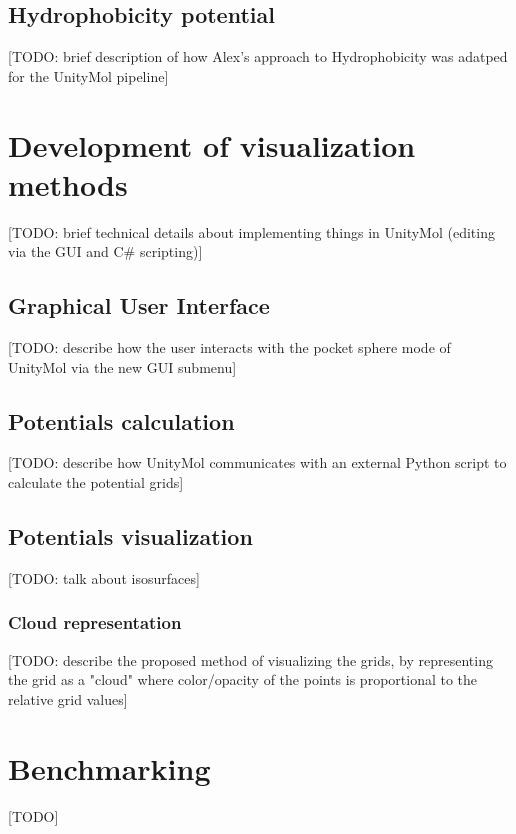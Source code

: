   \subsection{Hydrophobicity potential}
    [TODO: brief description of how Alex's approach to Hydrophobicity was adatped for the UnityMol pipeline]


\section{Development of visualization methods}
  [TODO: brief technical details about implementing things in UnityMol (editing via the GUI and C\# scripting)]

  \subsection{Graphical User Interface}
    [TODO: describe how the user interacts with the pocket sphere mode of UnityMol via the new GUI submenu]

  \subsection{Potentials calculation}
    [TODO: describe how UnityMol communicates with an external Python script to calculate the potential grids]

  \subsection{Potentials visualization}
    [TODO: talk about isosurfaces]

    \subsubsection{Cloud representation}
      [TODO: describe the proposed method of visualizing the grids, by representing the grid as a "cloud" where color/opacity of the points is proportional to the relative grid values]


\section{Benchmarking}
  [TODO]


